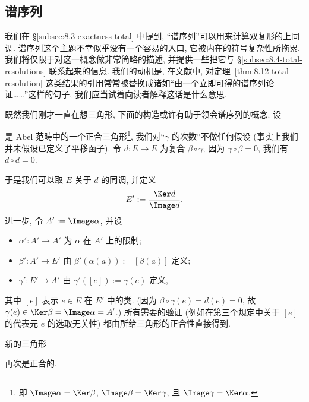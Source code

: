 \subsection{谱序列}\label{subsec:9.3-spectral}

我们在 \S\ref{subsec:8.3-exactness-total} 中提到, “谱序列”可以用来计算双复形的上同调. 谱序列这个主题不幸似乎没有一个容易的入口, 它被内在的符号复杂性所拖累. 我们将仅限于对这一概念做非常简略的描述, 并提供一些把它与 \S\ref{subsec:8.4-total-resolutions} 联系起来的信息. 我们的动机是, 在文献中, 对定理~\ref{thm:8.12-total-resolution} 这类结果的引用常常被替换成诸如“由一个立即可得的谱序列论证……”这样的句子, 我们应当试着向读者解释这话是什么意思.

既然我们刚才一直在想三角形, 下面的构造或许有助于领会谱序列的概念. 设
\begin{center}
\end{center}
是 Abel 范畴中的一个正合三角形\footnote{即 $\Image\alpha=\Ker\beta$, $\Image\beta=\Ker\gamma$, 且 $\Image\gamma=\Ker\alpha$.}, 我们对“$\gamma$ 的次数”不做任何假设 (事实上我们并未假设已定义了平移函子). 令 $d:E\to E$ 为复合 $\beta\circ\gamma$; 因为 $\gamma\circ\beta=0$, 我们有 $d\circ d=0$.

于是我们可以取 $E$ 关于 $d$ 的同调, 并定义
\[
E' := \frac{\Ker d}{\Image d}.
\]
进一步, 令 $A':=\Image\alpha$, 并设
\begin{itemize}
\item $\alpha':A'\to A'$ 为 $\alpha$ 在 $A'$ 上的限制;
\item $\beta':A'\to E'$ 由 $\beta'(\alpha(a)):=[\beta(a)]$ 定义;
\item $\gamma':E'\to A'$ 由 $\gamma'([e]):=\gamma(e)$ 定义,
\end{itemize}
其中 $[e]$ 表示 $e\in E$ 在 $E'$ 中的类. (因为 $\beta\circ\gamma(e)=d(e)=0$, 故 $\gamma(e)\in\Ker\beta=\Image\alpha=A'$.) 所有需要的验证 (例如在第三个规定中关于 $[e]$ 的代表元 $e$ 的选取无关性) 都由所给三角形的正合性直接得到.

\begin{proposition}\label{prop:9.1-claim}
新的三角形
\begin{center}
\end{center}
再次是正合的.
\end{proposition}

